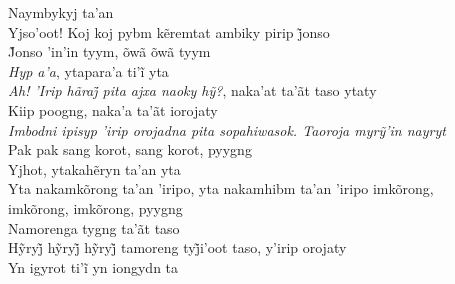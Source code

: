 \bigskip

\begin{linenumbers}\begingroup\raggedright

\noindent   Naymbykyj ta'an\\
  Yjso’oot! Koj koj pybm kẽremtat ambiky pirip j̃onso\\
  J̃onso ’in’in tyym, õwã õwã tyym\\
  \emph{Hyp a’a}, ytapara’a ti’ĩ yta\\
  \emph{Ah! ’Irip hãraj̃ pita ajxa naoky hỹ?}, naka’at ta’ãt taso ytaty\\
  Kiip poogng, naka'a ta'ãt iorojaty\\
  \emph{Imbodni ipisyp ’irip orojadna pita sopahiwasok. Taoroja myrỹ’in nayryt}\\
  Pak pak sang korot, sang korot, pyygng\\
  Yjhot, ytakahẽryn ta’an yta\\
  Yta nakamkõrong ta'an 'iripo, yta nakamhibm ta'an 'iripo imkõrong,\\
 imkõrong, imkõrong, pyygng\\
  Namorenga tygng ta'ãt taso\\
  Hỹryj̃ hỹryj̃ hỹryj̃ tamoreng tyj̃i’oot taso, y’irip orojaty\\
  Yn igyrot ti’ĩ yn iongydn ta

\end{linenumbers}\endgroup

\bigskip

